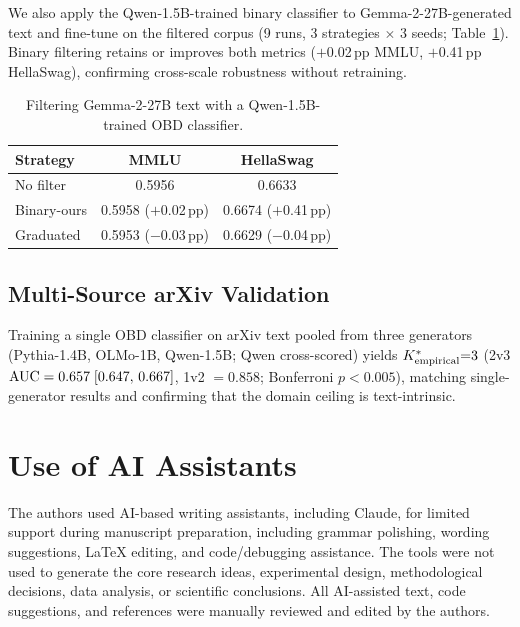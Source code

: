 We also apply the Qwen-1.5B-trained binary classifier to Gemma-2-27B-generated text and fine-tune on the filtered corpus (9 runs, 3 strategies $\times$ 3 seeds; Table~\ref{tab:gemma27b_filtering}).
Binary filtering retains or improves both metrics ($+$0.02\,pp MMLU, $+$0.41\,pp HellaSwag), confirming cross-scale robustness without retraining.

\begin{table}[H]
\centering
\footnotesize
\caption{Filtering Gemma-2-27B text with a Qwen-1.5B-trained OBD classifier.}
\label{tab:gemma27b_filtering}
\begin{tabular}{lcc}
\toprule
\textbf{Strategy} & \textbf{MMLU} & \textbf{HellaSwag} \\
\midrule
No filter          & 0.5956 & 0.6633 \\
Binary-ours        & 0.5958 ($+$0.02\,pp) & 0.6674 ($+$0.41\,pp) \\
Graduated          & 0.5953 ($-$0.03\,pp) & 0.6629 ($-$0.04\,pp) \\
\bottomrule
\end{tabular}
\end{table}

\subsection{Multi-Source arXiv Validation}
\label{sec:arxiv_multi_source}

Training a single OBD classifier on arXiv text pooled from three generators (Pythia-1.4B, OLMo-1B, Qwen-1.5B; Qwen cross-scored) yields ${K^*_{\text{empirical}}}{=}3$ (2v3 $\text{AUC} = 0.657\;[0.647,\,0.667]$, 1v2 $= 0.858$; Bonferroni $p < 0.005$), matching single-generator results and confirming that the domain ceiling is text-intrinsic.

\enlargethispage{2\baselineskip}
\section{Use of AI Assistants}
\label{app:ai-assistants}

The authors used AI-based writing assistants, including Claude, for limited support during manuscript preparation, including grammar polishing, wording suggestions, LaTeX editing, and code/debugging assistance. The tools were not used to generate the core research ideas, experimental design, methodological decisions, data analysis, or scientific conclusions. All AI-assisted text, code suggestions, and references were manually reviewed and edited by the authors.

